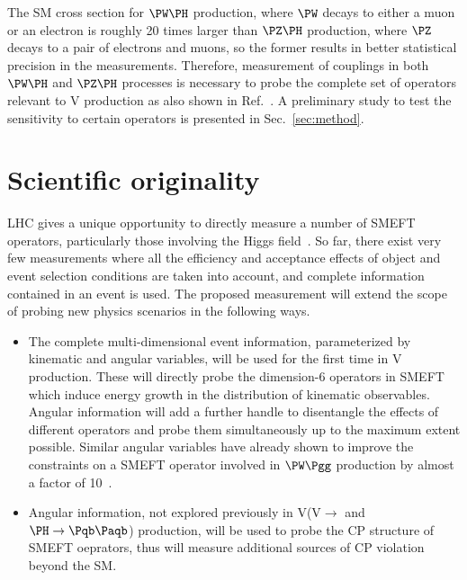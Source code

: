 \documentclass[a4paper,11pt]{article}
\newcommand{\Pb}{{{\Pqb}}\xspace}
\newcommand{\PAb}{{{{\Paqb}}}\xspace}
\renewcommand{\PV}{{{{V}}}\xspace}
\newcommand{\VH}{{{\PV}{\PH}}\xspace}
\begin{document}
The SM cross section for $\PW\PH$ production, where $\PW$ decays to either a muon or an electron is roughly 20 times larger than $\PZ\PH$ production, where $\PZ$ decays to a pair of electrons and muons, 
so the former results in better statistical precision in the measurements.
Therefore, measurement of couplings in both $\PW\PH$ and $\PZ\PH$ processes is necessary to probe the complete set of operators relevant to \VH production as also shown in Ref.~\cite{Banerjee:2019twi}.
A preliminary study to test the sensitivity to certain operators is presented in Sec.~\ref{sec:method}. 


\section{Scientific originality}

LHC gives a unique opportunity to directly measure a number of SMEFT operators, particularly those involving the Higgs field~\cite{Elias-Miro:2013mua,Gupta:2014rxa}. 
So far, there exist very few measurements where all the efficiency and acceptance effects of object and event selection conditions are taken into account, and complete information contained in an event is used.
The proposed measurement will extend the scope of probing new physics scenarios in the following ways.%
\begin{itemize}

\item The complete multi-dimensional event information, parameterized by kinematic and angular variables, will be used for the first time in \VH production.%
These will directly probe the dimension-6 operators in SMEFT which induce energy growth in the distribution of kinematic observables. 
Angular information will add a further handle to disentangle the effects of different operators and 
probe them simultaneously  up to the maximum extent possible.
Similar angular variables have already shown to improve the constraints on a SMEFT operator involved in $\PW\Pgg$ production by almost a factor of 10~\cite{CMS-PAS-SMP-20-005}.

\item Angular information, not explored previously in \VH (\PV $\to$ \Pl \Pl and $\PH \to \Pb \PAb$) production, will be used to probe the CP structure of SMEFT oeprators, thus will measure additional sources of CP violation beyond the SM.

\end{itemize}
\end{document}
